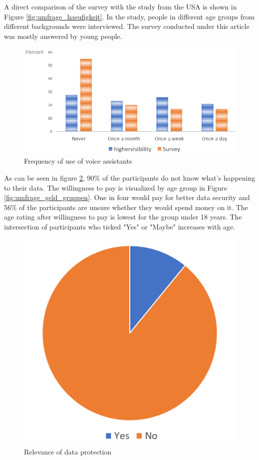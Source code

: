 A direct comparison of the survey with the study from the USA is shown in Figure \ref{fig:umfrage_haeufigkeit}. In the study, people in different age groups from different backgrounds were interviewed. The survey conducted under this article was mostly answered by young people.
\begin{figure}[h]
	\centering
	\includegraphics[width=0.9\linewidth]{Picture/umfrage_haeufigkeit}
	\caption[Frequency of use of voice assistants]{Frequency of use of voice assistants}
	\label{fig: survey_base}
\end{figure} 

As can be seen in figure \ref{fig:umfrage_datenschutz}, 90\% of the participants do not know what's happening to their data. The willingness to pay is visualized by age group in Figure \ref{fig:umfrage_geld_gruppen}. One in four would pay for better data security and 56\% of the participants are unsure whether they would spend money on it. The age rating after willingness to pay is lowest for the group under 18 years. The intersection of participants who ticked "Yes" or "Maybe" increases with age.

\begin{figure}[h]
	\centering
	\includegraphics[width=0.5\linewidth]{Picture/umfrage_datenschutz}
	\caption[Relevance of data protection]{Relevance of data protection}
	\label{fig:umfrage_datenschutz}
\end{figure}

